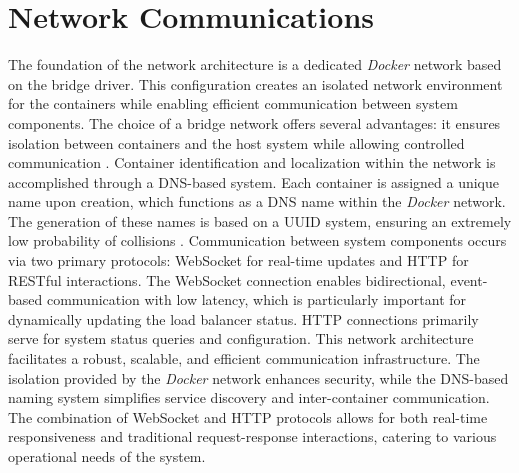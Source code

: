\documentclass[twocolumn]{webofc}
\begin{document}
\section{Network Communications}
The foundation of the network architecture is a dedicated \textit{Docker} network based on the bridge driver. This configuration creates an isolated network environment for the containers while enabling efficient communication between system components. The choice of a bridge network offers several advantages: it ensures isolation between containers and the host system while allowing controlled communication \cite{docker_bridge_network}. Container identification and localization within the network is accomplished through a DNS-based system. Each container is assigned a unique name upon creation, which functions as a DNS name within the \textit{Docker} network. The generation of these names is based on a UUID system, ensuring an extremely low probability of collisions \cite{uuid}. Communication between system components occurs via two primary protocols: WebSocket for real-time updates and HTTP for RESTful interactions. The WebSocket connection enables bidirectional, event-based communication with low latency, which is particularly important for dynamically updating the load balancer status. HTTP connections primarily serve for system status queries and configuration. This network architecture facilitates a robust, scalable, and efficient communication infrastructure. The isolation provided by the \textit{Docker} network enhances security, while the DNS-based naming system simplifies service discovery and inter-container communication. The combination of WebSocket and HTTP protocols allows for both real-time responsiveness and traditional request-response interactions, catering to various operational needs of the system.
\end{document}
